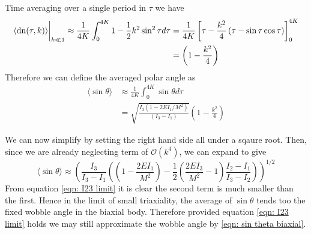 \documentclass[/home/greg/Thesis/main/main.tex]{subfiles}
\begin{document}
Time averaging over a single period in $\tau$ we have
\begin{align}
    \langle \mathrm{dn}(\tau, k) \rangle \bigg|_{k \ll 1} \approx  \frac{1}{4K}\int_{0}^{4K} 1 - \frac{1}{2}k^{2} \sin^{2}\tau d\tau & =
    \frac{1}{4K}\left[\tau  - \frac{k^{2}}{4}\left(\tau - \sin\tau\cos\tau\right) \right]_{0}^{4K} \\
    & = \left(1 - \frac{k^{2}}{4}\right)
\end{align}
Therefore we can define the averaged polar angle as
\begin{align}
\langle\sin\theta\rangle& \approx \frac{1}{4K}\int_{0}^{4K}\sin\theta d\tau \\
                 & = \sqrt{\frac{I_{3}(1 - 2EI_{1}/M^{2})}{\left(I_{3} - I_{1}\right)}}
                     \left(1 - \frac{k^{2}}{4}\right)
\label{eqn: bar sin theta triaxial}
\end{align}

We can now simplify by setting the right hand side all under a sqaure root. 
Then, since we are already neglecting term of $\mathcal{O}(k^{4})$, we can
expand to give
\begin{equation}
\langle\sin\theta\rangle \approx
    \left(
    \frac{I_{3}}{I_{3}-I_{1}}
    \left(
    \left(1 - \frac{2EI_{1}}{M^{2}}\right) 
    - \frac{1}{2}\left(\frac{2EI_{3}}{M^{2}} -1\right) \frac{I_{2}-I_{1}}{I_{3}-I_{2}}
\right)
\right)^{1/2}
\end{equation}
From equation \eqref{eqn: I23 limit} it is clear the second term is much smaller 
than the first. Hence in the limit of small triaxiality, the average of
$\sin\theta$ tends too the fixed wobble angle in the biaxial body. Therefore
provided equation \eqref{eqn: I23 limit} holds we may still approximate the wobble
angle by \eqref{eqn: sin theta biaxial}. 

\biblio
\end{document}

